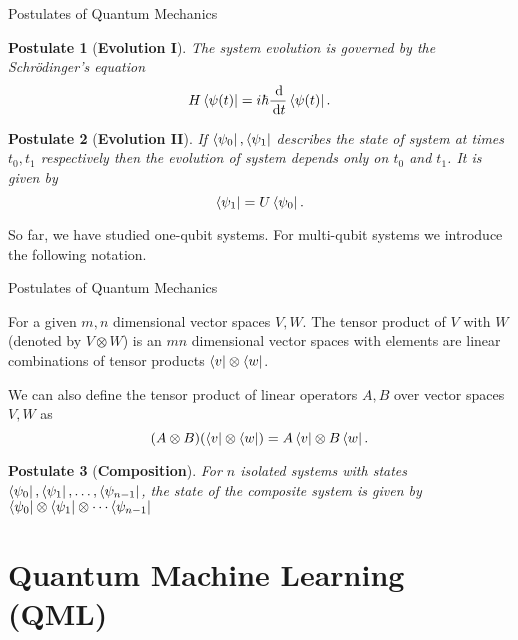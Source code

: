 \documentclass[aspectratio=169, handout]{beamer}
\renewcommand{\d}{\, \mathrm{d}}
\theoremstyle{example}
\newtheorem{postulate}{Postulate}
\begin{document}
\begin{frame}{Postulates of Quantum Mechanics}
  \pause\begin{postulate}[\textbf{Evolution I}]
The system evolution is governed by the Schrödinger's equation
\[H\bra{\psi(t)}=i\hbar\frac{\d}{\d t}\bra{\psi(t)}.\]
\end{postulate}
\pause\begin{postulate}[\textbf{Evolution II}]
If $\bra{\psi_0}, \bra{\psi_1}$ describes the state of system at times $t_0, t_1$ respectively then the evolution of system depends only on $t_0$ and $t_1$. It is given by
\[\bra{\psi_1} = U\bra{\psi_0}.\]
\end{postulate}
So far, we have studied one-qubit systems. For multi-qubit systems we introduce the following notation.
\end{frame}
\begin{frame}{Postulates of Quantum Mechanics}
    \pause\begin{definition}
For a given $m,n$ dimensional vector spaces $V,W$. The tensor product of $V$ with $W$ (denoted by $V\otimes W$) is an $mn$ dimensional vector spaces with elements are linear combinations of tensor products $\bra{v}\otimes\bra{w}$.
\end{definition}
We can also define the tensor product of linear operators $A,B$ over vector spaces $V,W$ as
\[(A\otimes B)(\bra{v}\otimes\bra{w})= A\bra{v}\otimes B\bra{w}.\]
\begin{postulate}[\textbf{Composition}]
For $n$ isolated systems with states $\bra{\psi_0}, \bra{\psi_1}, \ldots, \bra{\psi_{n-1}}$, the state of the composite system is given by $\bra{\psi_0}\otimes\bra{\psi_1}\otimes\cdots\bra{\psi_{n-1}}$
\end{postulate}
\end{frame}
\section{Quantum Machine Learning (QML)}
\end{document}

